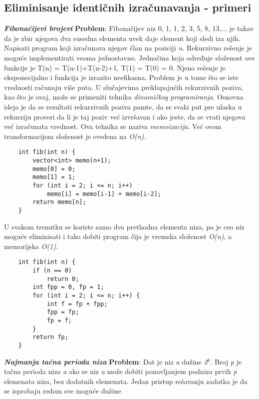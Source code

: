 \documentclass{article}
\begin{document}
\subsection{Eliminisanje identičnih izračunavanja - primeri}
\textit{\textbf{Fibonačijevi brojevi}}
\newline \textbf{Problem}: Fibonačijev niz 0, 1, 1, 2, 3, 5, 8, 13,... je takav da je zbir njegova dva susedna elementa uvek daje element koji sledi iza njih. Napisati program koji izračunava njegov član na poziciji \textit{n}.
\newline Rekurzivno rešenje je moguće implementirati veoma jednostavno.
Jednačina koja određuje složenost ove funkcije je
T(n) = T(n-1)+T(n-2)+1, T(1) = T(0) = 0. Njeno rešenje je eksponecijalno
i funkcija je izrazito neefikasna. Problem je u tome što se iste vrednosti računaju više puta. 
\newline U slučajevima preklapajućih rekurzivnih poziva, kao što je ovaj, može se primeniti
tehnika \textit{dinamičkog programiranja}. Osnovna
ideja je da se rezultati rekurzivnih poziva pamte, da se svaki put pre ulaska u
rekurziju proveri da li je taj poziv već izvršavan i ako jeste, da se vrati njegova
već izračunata vrednost. Ova tehnika se naziva \textit{memoizacija}. Već ovom transformacijom složenost je svedena na \textit{O(n)}.
\begin{lstlisting}
    int fib(int n) {
        vector<int> memo(n+1);
        memo[0] = 0;
        memo[1] = 1;
        for (int i = 2; i <= n; i++)
            memo[i] = memo[i-1] + memo[i-2];
        return memo[n];
    }
\end{lstlisting}
U svakom trenutku se koriste samo dva
prethodna elementa niza, pa je ceo niz moguće eliminisati i tako dobiti program
čija je vremska složenost \textit{O(n)}, a memorijska \textit{O(1)}.
\begin{lstlisting}
    int fib(int n) {
        if (n == 0)
            return 0;
        int fpp = 0, fp = 1;
        for (int i = 2; i <= n; i++) {
            int f = fp + fpp;
            fpp = fp;
            fp = f;
        }
        return fp;
    }
\end{lstlisting}
\textit{\textbf{Najmanja tačna perioda niza}}
\newline \textbf{Problem}: Dat je niz \textit{a} dužine \textit{2$^k$}. Broj \textit{p} je tačna perioda niza \textit{a} ako se niz
\textit{a} može dobiti ponavljanjem podniza prvih \textit{p} elemenata niza, bez dodatnih
elemenata. 
\newline Jedan pristup rešavanju zadatka je da se isprobaju redom sve moguće dužine
\end{document}
